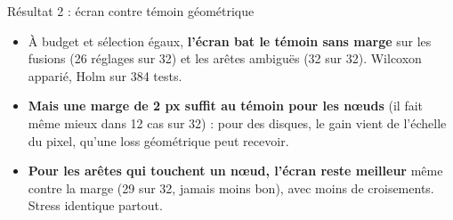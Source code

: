 \documentclass[aspectratio=169,11pt]{beamer}
\begin{document}
\begin{frame}{Résultat 2 : écran contre témoin géométrique}
\centering
\footnotesize
\setlength{\tabcolsep}{4pt}

\vspace{0.35cm}
\begin{minipage}{0.95\textwidth}
\footnotesize
\begin{itemize}
\setlength{\itemsep}{2pt}
\item À budget et sélection égaux, \textbf{l'écran bat le témoin sans marge} sur les fusions (26 réglages sur 32) et les arêtes ambiguës (32 sur 32). Wilcoxon apparié, Holm sur 384 tests.
\item \textbf{Mais une marge de 2 px suffit au témoin pour les nœuds} (il fait même mieux dans 12 cas sur 32) : pour des disques, le gain vient de l'échelle du pixel, qu'une loss géométrique peut recevoir.
\item \textbf{Pour les arêtes qui touchent un nœud, l'écran reste meilleur} même contre la marge (29 sur 32, jamais moins bon), avec moins de croisements. Stress identique partout.
\end{itemize}
\end{minipage}
\end{frame}
\end{document}

